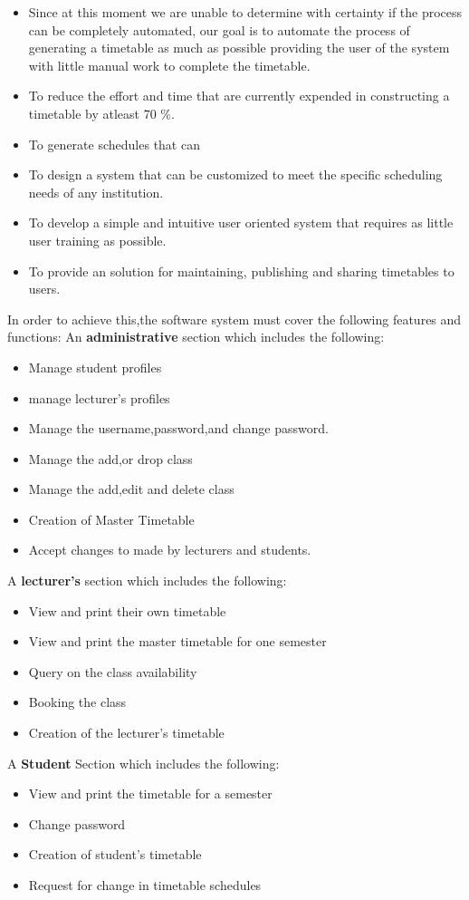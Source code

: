\documentclass{scrreprt}
\begin{document}
\begin{itemize}
 \item Since at this moment we are unable to determine with certainty if the process can be completely automated, our goal is to automate the process of generating a timetable as much as possible providing the user of the system with little manual work to complete the timetable.
 \item  To reduce the effort and time that are currently expended in constructing a timetable by atleast 70 \%.
 \item To generate schedules that can 
 \item To design a system that can be customized to meet the specific scheduling needs of any institution.
 \item To develop a simple and intuitive user oriented system that requires as little user training as possible.
 \item To provide an solution for maintaining, publishing and sharing timetables to users.
\end{itemize} 
In order to achieve this,the software system must cover the following features and functions:
An \textbf{administrative} section which includes the following:
\begin{itemize}
\item Manage student profiles
\item manage lecturer's profiles
\item Manage the username,password,and change password.
\item Manage the add,or drop class
\item Manage the add,edit and delete class
\item Creation of Master Timetable
\item Accept changes to made by lecturers and students.
\end{itemize}
A \textbf{lecturer's} section which includes the following:
\begin{itemize}
\item View and print their own timetable
\item View and print the master timetable for one semester
\item Query on the class availability
\item Booking the class
\item Creation of the lecturer's timetable
\end{itemize}
A \textbf{Student} Section which includes the following:
\begin{itemize}
\item View and print the timetable for a semester
\item Change password
\item Creation of student's timetable
\item Request for change in timetable schedules
\end {itemize}
\end{document}
